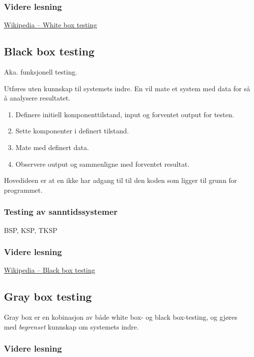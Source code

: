 \subsubsection{Videre lesning}

\href{http://en.wikipedia.org/wiki/White\_box\_testing}{Wikipedia --
White box testing}

\subsection{Black box testing}

Aka. funksjonell testing.

Utføres uten kunnskap til systemets indre. En vil mate et system med
data for så å analysere resultatet.

\begin{enumerate}[1.]
\item
  Definere initiell komponenttilstand, input og forventet output for
  testen.
\item
  Sette komponenter i definert tilstand.
\item
  Mate med definert data.
\item
  Observere output og sammenligne med forventet resultat.
\end{enumerate}
Hovedideen er at en ikke har adgang til til den koden som ligger til
grunn for programmet.

\subsubsection{Testing av sanntidssystemer}

BSP, KSP, TKSP

\subsubsection{Videre lesning}

\href{http://en.wikipedia.org/wiki/Black\_box\_testing}{Wikipedia --
Black box testing}

\subsection{Gray box testing}

Gray box er en kobinasjon av både white box- og black box-testing, og
gjøres med \emph{begrenset} kunnskap om systemets indre.

\subsubsection{Videre lesning}


